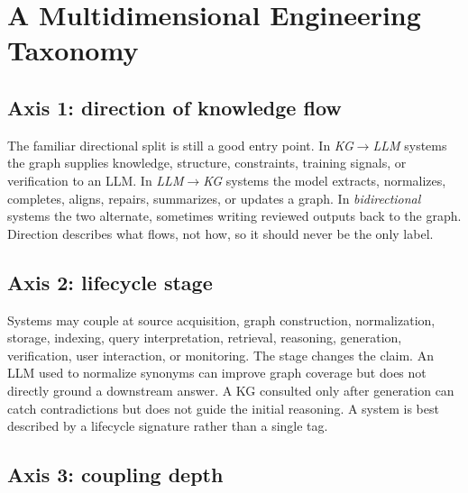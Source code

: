 \section{A Multidimensional Engineering Taxonomy}
\label{sec:taxonomy}


\subsection{Axis 1: direction of knowledge flow}

The familiar directional split is still a good entry point. In \emph{KG$\rightarrow$LLM} systems the graph supplies knowledge, structure, constraints, training signals, or verification to an LLM. In \emph{LLM$\rightarrow$KG} systems the model extracts, normalizes, completes, aligns, repairs, summarizes, or updates a graph. In \emph{bidirectional} systems the two alternate, sometimes writing reviewed outputs back to the graph. Direction describes what flows, not how, so it should never be the only label.

\subsection{Axis 2: lifecycle stage}

Systems may couple at source acquisition, graph construction, normalization, storage, indexing, query interpretation, retrieval, reasoning, generation, verification, user interaction, or monitoring. The stage changes the claim. An LLM used to normalize synonyms can improve graph coverage but does not directly ground a downstream answer. A KG consulted only after generation can catch contradictions but does not guide the initial reasoning. A system is best described by a lifecycle signature rather than a single tag.

\subsection{Axis 3: coupling depth}

